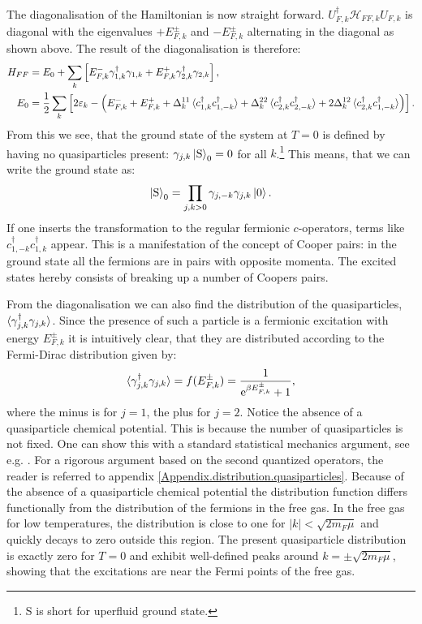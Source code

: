 The diagonalisation of the Hamiltonian is now straight forward. $U^\dagger_{F,k}\mathcal{H}_{FF,k}U_{F,k}$ is diagonal with the eigenvalues $+E^{\pm}_{F,k}$ and $-E^{\pm}_{F,k}$ alternating in the diagonal as shown above. The result of the diagonalisation is therefore:
\begin{align}
H_{FF} &= E_0 + \sum_{k} \left[ E^{-}_{F,k}\gamma^\dagger_{1, k}\gamma_{1, k} + E^{+}_{F,k}\gamma^\dagger_{2, k}\gamma_{2, k} \right], \nonumber \\ 
E_0 &= \frac{1}{2}\sum_k \left[2\varepsilon_k - \left( E^{-}_{F,k} + E^{+}_{F,k} + \Delta^{11}_k\braket{c^\dagger_{1,k}c^\dagger_{1,-k}} + \Delta^{22}_k\braket{c^\dagger_{2,k}c^\dagger_{2,-k}} + 2\Delta^{12}_k\braket{c^\dagger_{2,k}c^\dagger_{1,-k}} \right) \right]. 
\label{eq.2wiresDiagonalisedHamiltonian}
\end{align}  
From this we see, that the ground state of the system at $T = 0$ is defined by having no quasiparticles present: $\gamma_{j,k} \ket{\text{S}}_0 = 0$ for all $k$.\footnote{S is short for uperfluid ground state.} This means, that we can write the ground state as:
\begin{equation}
\ket{\text{S}}_0 = \prod_{j,k > 0} \gamma_{j,-k}\gamma_{j,k}\ket{0}.
\label{eq.superfluidgroundstate}
\end{equation}
If one inserts the transformation to the regular fermionic $c$-operators, terms like $c^\dagger_{1,-k}c^\dagger_{1,k}$ appear. This is a manifestation of the concept of Cooper pairs: in the ground state all the fermions are in pairs with opposite momenta. The excited states hereby consists of breaking up a number of Coopers pairs.   

From the diagonalisation we can also find the distribution of the quasiparticles, $\braket{\gamma^\dagger_{j,k}\gamma_{j,k}}$. Since the presence of such a particle is a fermionic excitation with energy $E^{\pm}_{F,k}$ it is intuitively clear, that they are distributed according to the Fermi-Dirac distribution given by:
\begin{equation}
\braket{\gamma^\dagger_{j,k} \gamma_{j,k}} = f(E^{\pm}_{F,k}) = \frac{1}{\text{e}^{\beta E^{\pm}_{F,k}} + 1}, 
\label{eq.Distribution.quasiparticles}
\end{equation}
where the minus is for $j = 1$, the plus for $j = 2$. Notice the absence of a quasiparticle chemical potential. This is because the number of quasiparticles is not fixed. One can show this with a standard statistical mechanics argument, see e.g. \cite[p. 225]{SchroederThermal}. For a rigorous argument based on the second quantized operators, the reader is referred to appendix \ref{Appendix.distribution.quasiparticles}. Because of the absence of a quasiparticle chemical potential the distribution function differs functionally from the distribution of the fermions in the free gas. In the free gas for low temperatures, the distribution is close to one for $|k|< \sqrt{2m_F\mu}$ and quickly decays to zero outside this region. The present quasiparticle distribution is exactly zero for $T = 0$ and exhibit well-defined peaks around $k = \pm \sqrt{2m_F\mu}$, showing that the excitations are near the Fermi points of the free gas. 


